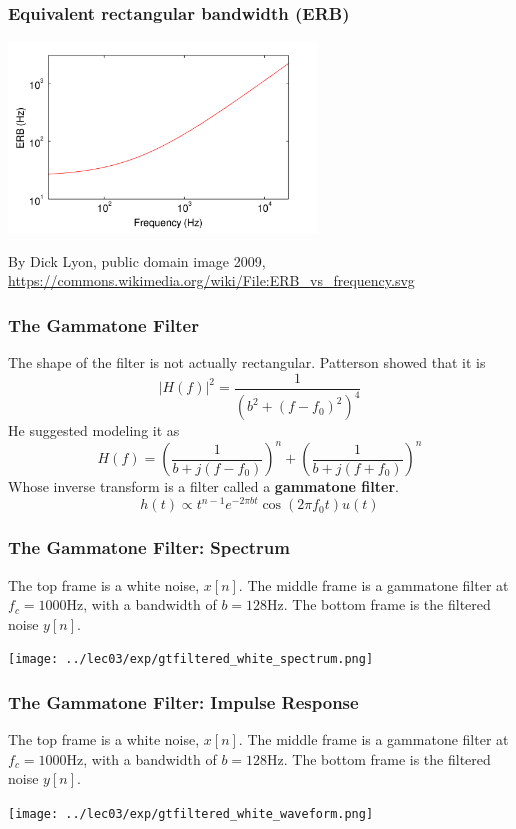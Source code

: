 \documentclass{beamer}
\begin{document}
\begin{frame}
  \frametitle{Equivalent rectangular bandwidth (ERB)}

  \centerline{\includegraphics[height=2in]{../lec04/2560px-ERB_vs_frequency.png}}
  \begin{tiny}
    By Dick Lyon, public domain image 2009,
    \url{https://commons.wikimedia.org/wiki/File:ERB_vs_frequency.svg}
  \end{tiny}
\end{frame}

\begin{frame}
  \frametitle{The Gammatone Filter}

  The shape of the filter is not actually rectangular.  Patterson showed that it is
  \[
  |H(f)|^2 = \frac{1}{(b^2+(f-f_0)^2)^4}
  \]  
  He suggested modeling it as
  \[
  H(f) = \left(\frac{1}{b + j(f-f_0)}\right)^n + \left(\frac{1}{b + j(f+f_0)}\right)^n
  \]
  Whose inverse transform is a filter called a {\bf gammatone filter}.
  \[
  h(t) \propto t^{n-1} e^{-2\pi bt}\cos(2\pi f_0 t)u(t)
  \]
\end{frame}

\begin{frame}
  \frametitle{The Gammatone Filter: Spectrum}

  The top frame is a white noise, $x[n]$.  The middle frame is a
  gammatone filter at $f_c=1000$Hz, with a bandwidth of $b=128$Hz.
  The bottom frame is the filtered noise $y[n]$.

  \centerline{\texttt{[image: ../lec03/exp/gtfiltered\_white\_spectrum.png]}}
\end{frame}
  
\begin{frame}
  \frametitle{The Gammatone Filter: Impulse Response}

  The top frame is a white noise, $x[n]$.  The middle frame is a
  gammatone filter at $f_c=1000$Hz, with a bandwidth of $b=128$Hz.
  The bottom frame is the filtered noise $y[n]$.

  \centerline{\texttt{[image: ../lec03/exp/gtfiltered\_white\_waveform.png]}}
\end{frame}
\end{document}
